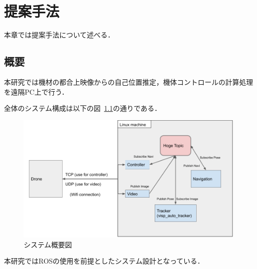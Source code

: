 \chapter{提案手法}
\label{proposed}

本章では提案手法について述べる．

\section{概要}
本研究では機材の都合上映像からの自己位置推定，機体コントロールの計算処理を遠隔PC上で行う．

全体のシステム構成は以下の図~\ref{fig:all_struct}の通りである．
\begin{figure}[htbp]
  \begin{center}
    \includegraphics[clip,width=15.0cm]{img/all_struct.png}
    \caption{システム概要図}
    \label{fig:all_struct}
  \end{center}
\end{figure}

本研究ではROSの使用を前提としたシステム設計となっている．






